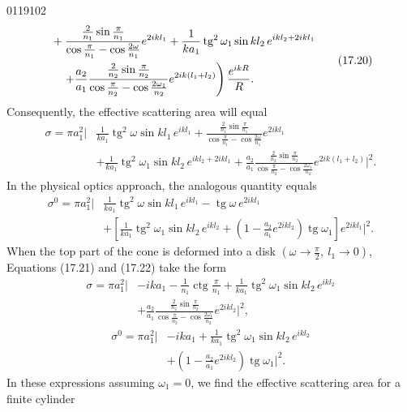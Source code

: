 \begin{scanpage}{0119}{102}
\[\begin{aligned}\left.\vphantom{\frac11}\right.&+\frac{\frac2{n_1}\sin\frac\pi{n_1}}{\cos\frac\pi{n_1}-\cos\frac{2\omega}{n_1}}e^{2ikl_1}+\frac1{ka_1}\operatorname{tg}^2\omega_1\sin kl_2\,e^{ikl_2+2ikl_1}\\&\left.\quad+\frac{a_2}{a_1}\frac{\frac2{n_2}\sin\frac\pi{n_2}}{\cos\frac\pi{n_2}-\cos\frac{2\omega_1}{n_2}}e^{2ik(l_1+l_2)}\right)\frac{e^{ikR}}R.
\end{aligned}\tag{17.20}\]
Consequently, the effective scattering area will equal
\[\begin{aligned}\sigma=\pi a_1^2\biggl|&\frac1{ka_1}\operatorname{tg}^2\omega\sin kl_1\,e^{ikl_1}+\frac{\frac2{n_1}\sin\frac\pi{n_1}}{\cos\frac\pi{n_1}-\cos\frac{2\omega}{n_1}}e^{2ikl_1}\\&+\frac1{ka_1}\operatorname{tg}^2\omega_1\sin kl_2\,e^{ikl_2+2ikl_1}+\frac{a_2}{a_1}\frac{\frac2{n_2}\sin\frac\pi{n_2}}{\cos\frac\pi{n_2}-\cos\frac{2\omega_1}{n_2}}e^{2ik(l_1+l_2)}\biggr|^2.
\end{aligned}\tag{17.21}\]
In the physical optics approach, the analogous quantity equals
\[\begin{aligned}\sigma^0=\pi a_1^2\biggl|&\frac1{ka_1}\operatorname{tg}^2\omega\sin kl_1\,e^{ikl_1}-\operatorname{tg}\omega\,e^{2ikl_1}\\&+\left[\frac1{ka_1}\operatorname{tg}^2\omega_1\sin kl_2\,e^{ikl_2}+\left(1-\frac{a_2}{a_1}e^{2ikl_2}\right)\operatorname{tg}\omega_1\right]e^{2ikl_1}\biggr|^2.
\end{aligned}\tag{17.22}\]
When the top part of the cone is deformed into a disk $(\omega\to\frac\pi2,\ l_1\to0)$, Equations (17.21) and (17.22) take the form
\[\begin{aligned}\sigma=\pi a_1^2\biggl|&-ika_1-\frac1{n_1}\operatorname{ctg}\frac\pi{n_1}+\frac1{ka_1}\operatorname{tg}^2\omega_1\sin kl_2\,e^{ikl_2}\\&+\frac{a_2}{a_1}\frac{\frac2{n_2}\sin\frac\pi{n_2}}{\cos\frac\pi{n_2}-\cos\frac{2\omega_1}{n_2}}e^{2ikl_2}\biggr|^2,
\end{aligned}\tag{17.23}\]
\[\begin{aligned}\sigma^0=\pi a_1^2\biggl|&-ika_1+\frac1{ka_1}\operatorname{tg}^2\omega_1\sin kl_2\,e^{ikl_2}\\&+\left(1-\frac{a_2}{a_1}e^{2ikl_2}\right)\operatorname{tg}\omega_1\biggr|^2.
\end{aligned}\tag{17.24}\]
In these expressions assuming $\omega_1=0$, we find the effective scattering area for a finite cylinder
\end{scanpage}
